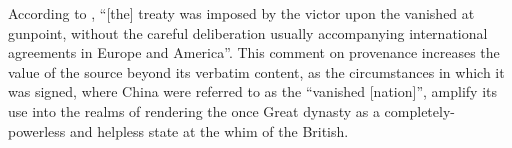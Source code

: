 \documentclass{article}
\begin{document}
According to
\autocite{Hsu:1999}, ``[the] treaty was imposed by the victor upon the vanished at gunpoint, without the careful deliberation usually accompanying international agreements in Europe and America''. This comment on provenance increases the value of the source beyond its verbatim content, as the circumstances in which it was signed, where China were referred to as the ``vanished [nation]'', amplify its use into the realms of rendering the once Great dynasty as a completely-powerless and helpless state at the whim of the British.

\pagebreak
\printbibliography[title={Cited Works}, heading=bibintoc]
\end{document}
